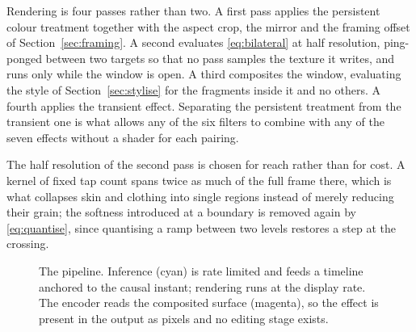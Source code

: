 \documentclass{article}
\theoremstyle{definition}
\begin{document}
Rendering is four passes rather than two. A first pass applies the persistent
colour treatment together with the aspect crop, the mirror and the framing offset
of Section~\ref{sec:framing}. A second evaluates \eqref{eq:bilateral} at half
resolution, ping-ponged between two targets so that no pass samples the texture
it writes, and runs only while the window is open. A third composites the window,
evaluating the style of Section~\ref{sec:stylise} for the fragments inside it and
no others. A fourth applies the transient effect. Separating the persistent
treatment from the transient one is what allows any of the six filters to combine
with any of the seven effects without a shader for each pairing.

The half resolution of the second pass is chosen for reach rather than for cost.
A kernel of fixed tap count spans twice as much of the full frame there, which is
what collapses skin and clothing into single regions instead of merely reducing
their grain; the softness introduced at a boundary is removed again by
\eqref{eq:quantise}, since quantising a ramp between two levels restores a step at
the crossing.

\begin{figure}[t]
  \centering
  \caption{The pipeline. Inference (cyan) is rate limited and feeds a timeline
  anchored to the causal instant; rendering runs at the display rate. The
  encoder reads the composited surface (magenta), so the effect is present in
  the output as pixels and no editing stage exists.}
  \label{fig:pipeline}
\end{figure}
\end{document}
